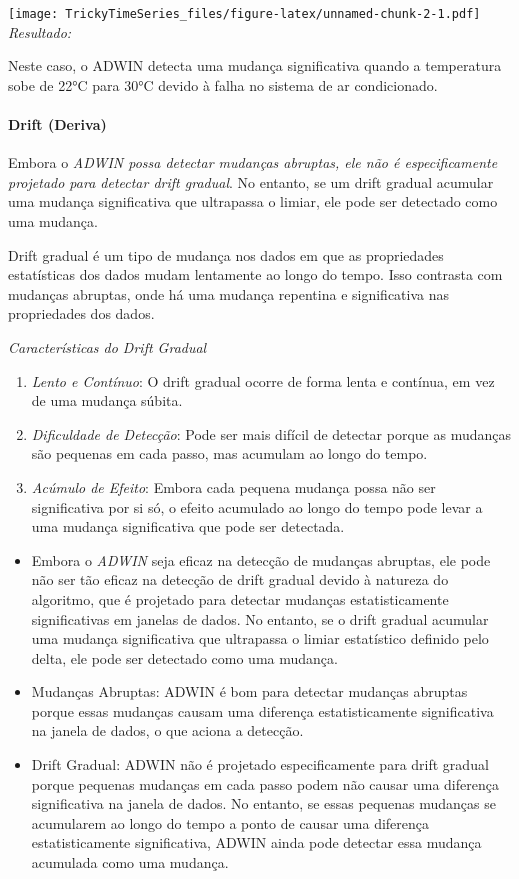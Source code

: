 \documentclass[
]{article}
\begin{document}
\texttt{[image: TrickyTimeSeries\_files/figure-latex/unnamed-chunk-2-1.pdf]}
\emph{Resultado:}

Neste caso, o ADWIN detecta uma mudança significativa quando a
temperatura sobe de 22°C para 30°C devido à falha no sistema de ar
condicionado.

\hypertarget{drift-deriva}{%
\paragraph{Drift (Deriva)}\label{drift-deriva}}

Embora o \emph{ADWIN possa detectar mudanças abruptas, ele não é
especificamente projetado para detectar drift gradual}. No entanto, se
um drift gradual acumular uma mudança significativa que ultrapassa o
limiar, ele pode ser detectado como uma mudança.

Drift gradual é um tipo de mudança nos dados em que as propriedades
estatísticas dos dados mudam lentamente ao longo do tempo. Isso
contrasta com mudanças abruptas, onde há uma mudança repentina e
significativa nas propriedades dos dados.

\emph{Características do Drift Gradual}

\begin{enumerate}
\def\labelenumi{\arabic{enumi}.}
\item
  \emph{Lento e Contínuo}: O drift gradual ocorre de forma lenta e
  contínua, em vez de uma mudança súbita.
\item
  \emph{Dificuldade de Detecção}: Pode ser mais difícil de detectar
  porque as mudanças são pequenas em cada passo, mas acumulam ao longo
  do tempo.
\item
  \emph{Acúmulo de Efeito}: Embora cada pequena mudança possa não ser
  significativa por si só, o efeito acumulado ao longo do tempo pode
  levar a uma mudança significativa que pode ser detectada.
\end{enumerate}

\begin{itemize}
\item
  Embora o \emph{ADWIN} seja eficaz na detecção de mudanças abruptas,
  ele pode não ser tão eficaz na detecção de drift gradual devido à
  natureza do algoritmo, que é projetado para detectar mudanças
  estatisticamente significativas em janelas de dados. No entanto, se o
  drift gradual acumular uma mudança significativa que ultrapassa o
  limiar estatístico definido pelo delta, ele pode ser detectado como
  uma mudança.
\item
  Mudanças Abruptas: ADWIN é bom para detectar mudanças abruptas porque
  essas mudanças causam uma diferença estatisticamente significativa na
  janela de dados, o que aciona a detecção.
\item
  Drift Gradual: ADWIN não é projetado especificamente para drift
  gradual porque pequenas mudanças em cada passo podem não causar uma
  diferença significativa na janela de dados. No entanto, se essas
  pequenas mudanças se acumularem ao longo do tempo a ponto de causar
  uma diferença estatisticamente significativa, ADWIN ainda pode
  detectar essa mudança acumulada como uma mudança.
\end{itemize}
\end{document}
